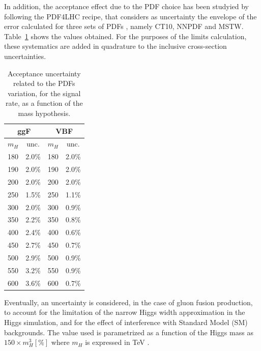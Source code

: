 In addition, the acceptance effect due to the PDF choice has been
studyied by following the PDF4LHC recipe, that considers as
uncertainty the envelope of the error calculated for three sets of
PDFs \cite{Whalley:2005nh}, namely CT10, NNPDF and MSTW.
Table~\ref{tab:signalPDF} shows the values obtained.  For the purposes
of the limits calculation, these systematics are added in quadrature
to the inclusive cross-section uncertainties.
%
\begin{table}[h!t]
  \caption{Acceptance uncertainty related to the PDFs variation, 
           for the signal rate, as a function of the mass hypothesis.}
  \label{tab:signalPDF}
  \begin{center}
    \begin{tabular}{lc|lc}
      \hline
      \multicolumn{2}{c|}{ggF} & \multicolumn{2}{c}{VBF} \\
      \hline
      $m_{H}$ &  unc.   & $m_{H}$ &  unc.  \\
      \hline
       180  &  2.0\%  &  180  &  2.0\% \\ %
       190  &  2.0\%  &  190  &  2.0\% \\ %
       200  &  2.0\%  &  200  &  2.0\% \\ %
       250  &  1.5\%  &  250  &  1.1\% \\  
       300  &  2.0\%  &  300  &  0.9\% \\  
       350  &  2.2\%  &  350  &  0.8\% \\  
       400  &  2.4\%  &  400  &  0.6\% \\  
       450  &  2.7\%  &  450  &  0.7\% \\  
       500  &  2.9\%  &  500  &  0.9\% \\  
       550  &  3.2\%  &  550  &  0.9\% \\  
       600  &  3.6\%  &  600  &  0.7\% \\  
      \hline
    \end{tabular}
  \end{center}
\end{table}

Eventually, an uncertainty is considered, in the case of gluon fusion
production, to account for the limitation of the narrow Higgs width
approximation in the Higgs simulation, and for the effect of
interference with Standard Model (SM) backgrounds.  The value used is
parametrized as a function of the Higgs mass as $150 \times m_H^3
[\%]$ where $m_H$ is expressed in TeV
\cite{Passarino:2010qk,Campbell:2011cu,Anastasiou:2011pi}.

